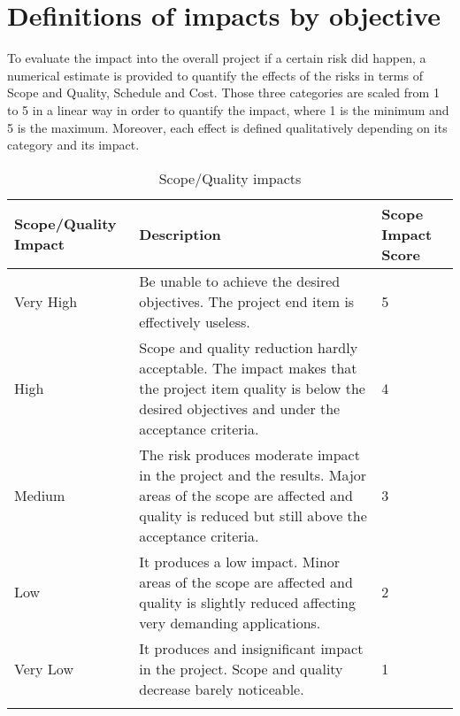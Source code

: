 \section{Definitions of impacts by objective}
\label{3.2}
To evaluate the impact into the overall project if a certain risk did happen, a numerical estimate is provided to quantify the effects of the risks in terms of Scope and Quality, Schedule and Cost. Those three categories are scaled from 1 to 5 in a linear way in order to quantify the impact, where 1 is the minimum and 5 is the maximum. Moreover, each effect is defined qualitatively depending on its category and its impact. 

\begin{longtable}[H]{l >{\raggedright\arraybackslash}p{6.3cm} p{3.5cm}}
	
	\toprule[2pt]
	
	\textbf{Scope/Quality Impact} &  \textbf{Description}  & \textbf{Scope Impact Score} \\
	
	\midrule [1.5pt]
	\endhead
	
	Very High & Be unable to achieve the desired objectives. The project end item is effectively useless. & 5 
	\vspace{0.2cm} \\
	
	\midrule
	
	High & Scope and quality reduction hardly acceptable. The impact makes that the project item quality is below the desired objectives and under the acceptance criteria. & 4 
	\vspace{0.2cm} \\
	
	\midrule
	
	Medium & The risk produces moderate impact in the project and the results. Major areas of the scope are affected and quality is reduced but still above the acceptance criteria. & 3
	\vspace{0.2cm} \\

	\midrule

	Low & It produces a low impact. Minor areas of the scope are affected and quality is slightly reduced affecting very demanding applications. & 2
	\vspace{0.2cm} \\

	\midrule

	Very Low & It produces and insignificant impact in the project. Scope and quality decrease barely noticeable. & 1
	\vspace{0.2cm} \\
		
	\bottomrule[2pt]
	
	\caption{Scope/Quality impacts}

\end{longtable}




